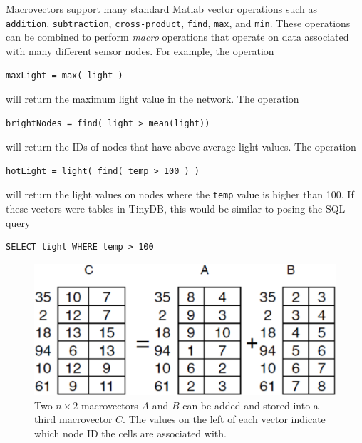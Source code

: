 Macrovectors support many standard Matlab vector operations such as {\tt
addition}, {\tt subtraction}, {\tt cross-product}, {\tt find}, {\tt max}, and
{\tt min}.  These operations can be combined to perform {\em macro} operations
that operate on data associated with many different sensor nodes.  For example,
the operation \vspace{.1in}
\begin{center}
\ttfamily\small
\begin{verbatim}
maxLight = max( light )
\end{verbatim}
\end{center}
\vspace{.1in}
will return the maximum light value in the network.  
The operation
\vspace{.1in}
\begin{center}
\ttfamily\small
\begin{verbatim}
brightNodes = find( light > mean(light))
\end{verbatim}
\end{center}
\vspace{.1in}
will return the IDs of nodes that have above-average light values.  
The operation
\vspace{.1in}
\begin{center}
\ttfamily\small
\begin{verbatim}
hotLight = light( find( temp > 100 ) )
\end{verbatim}
\end{center}
\vspace{.1in}
will return the light values on nodes where the {\tt temp} value is higher
than 100.  If these vectors were tables in TinyDB, this would be similar
to posing the SQL query
\vspace{.1in}
\begin{center}
\ttfamily\small
\begin{verbatim}
SELECT light WHERE temp > 100
\end{verbatim}
\end{center}
\vspace{.1in}

\begin{figure}
  \centering
  \includegraphics[width=0.6\columnwidth]{fig/DistributedArray1.eps}
  \caption[Example of a distributed macrovector]{Two $n \times 2$ macrovectors
  $A$ and $B$ can be added and stored into a third macrovector $C$. The values
  on the left of each vector indicate which node ID the cells are associated
  with.}
  \label{fig:macroVectorAddition}
\end{figure}

